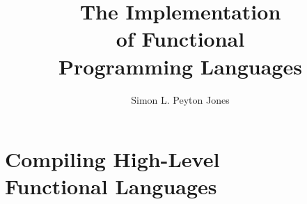 \documentclass[12pt, b5paper, oldfontcommands]{memoir}
\title{{The Implementation\\ of Functional\\ \vspace{10pt}Programming Languages}}
\author{Simon L. Peyton Jones}
\begin{document}



\mainmatter



\part[Compiling High-Level Functional Languages]{Compiling High-Level\\ Functional Languages}












%
\end{document}
